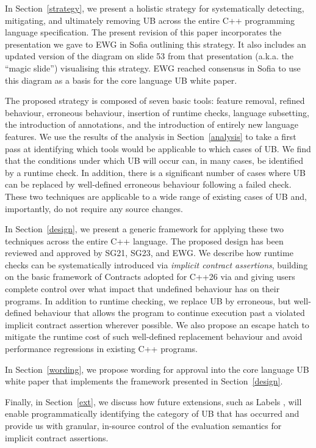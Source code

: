 In Section~\ref{strategy}, we present a holistic strategy for systematically detecting, mitigating, and ultimately removing UB across the entire C++ programming language specification. The present revision of this paper incorporates the presentation \cite{P3754R0} we gave to EWG in Sofia outlining this strategy. It also includes an updated version of the diagram on slide 53 from that presentation (a.k.a. the ``magic slide'') visualising this strategy. EWG reached consensus in Sofia to use this diagram as a basis for the core language UB white paper.

The proposed strategy is composed of seven basic tools: feature removal, refined behaviour, erroneous behaviour, insertion of runtime checks, language subsetting, the introduction of annotations, and the introduction of entirely new language features. We use the results of the analysis in Section~\ref{analysis} to take a first pass at identifying which tools would be applicable to which cases of UB. We find that the conditions under which UB will occur can, in many cases, be identified by a runtime check. In addition, there is a significant number of cases where UB can be replaced by well-defined erroneous behaviour following a failed check. These two techniques are applicable to a wide range of existing cases of UB and, importantly, do not require any source changes.

In Section~\ref{design}, we present a generic framework for applying these two techniques across the entire C++ language. The proposed design has been reviewed and approved by SG21, SG23, and EWG. We describe how runtime checks can be systematically introduced via \emph{implicit contract assertions}, building on the basic framework of Contracts adopted for C++26 via \cite{P2900R14} and giving users complete control over what impact that undefined behaviour has on their programs. In addition to runtime checking, we replace UB by erroneous, but well-defined behaviour that allows the program to continue execution past a violated implicit contract assertion wherever possible. We also propose an escape hatch to mitigate the runtime cost of such well-defined replacement behaviour and avoid performance regressions in existing C++ programs.

In Section~\ref{wording}, we propose wording for approval into the core language UB white paper \cite{P3656R1} that implements the framework presented in Section~\ref{design}.

Finally, in Section~\ref{ext}, we discuss how future extensions, such as Labels \cite{P3400R1},
will enable programmatically identifying the category of UB that has occurred and provide us with granular, in-source control of the evaluation semantics for implicit contract assertions.

